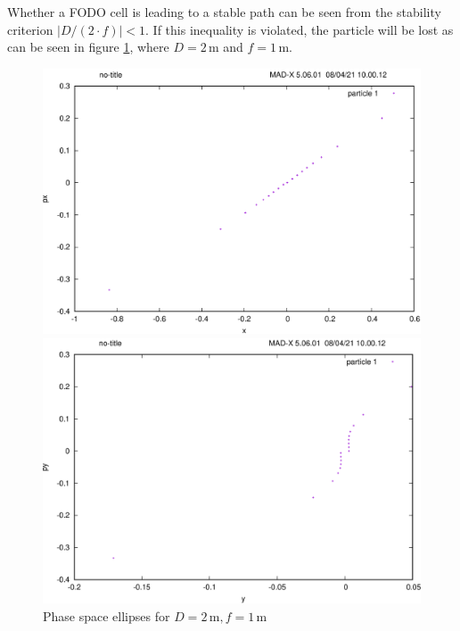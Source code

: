 Whether a FODO cell is leading to a stable path can be seen from the stability criterion $|D/(2\cdot f)|<1$.
If this inequality is violated, the particle will be lost as can be seen in figure \ref{fig:unstable}, where $D=2\,\mathrm{m}$ and $f=1\,\mathrm{m}$.

\begin{figure}[tbp]
    \centering
    \begin{minipage}{0.49\textwidth}
        \includegraphics[width=\textwidth]{../../part1/d2f1_x.png}
    \end{minipage}\hfill
    \begin{minipage}{0.49\textwidth}
        \centering
        \includegraphics[width=\textwidth]{../../part1/d2f1_y.png}
    \end{minipage}
    \caption{Phase space ellipses for $D=2\,\mathrm{m}, f=1\,\mathrm{m}$}
    \label{fig:unstable}
\end{figure}

